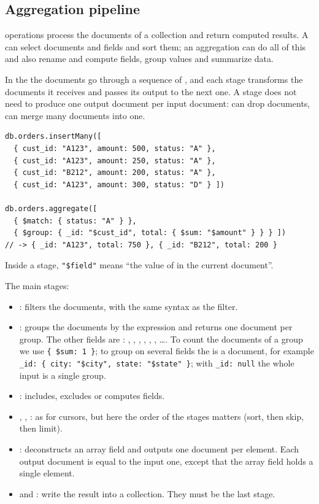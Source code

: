 \subsection{Aggregation pipeline}
 operations process the documents of a collection and return computed results. A  can select documents and fields and sort them; an aggregation can do all of this and also rename and compute fields, group values and summarize data.

In the  the documents go through a sequence of , and each stage transforms the documents it receives and passes its output to the next one. A stage does not need to produce one output document per input document:  can drop documents,  can merge many documents into one.

\begin{example}
\begin{lstlisting}
db.orders.insertMany([
  { cust_id: "A123", amount: 500, status: "A" },
  { cust_id: "A123", amount: 250, status: "A" },
  { cust_id: "B212", amount: 200, status: "A" },
  { cust_id: "A123", amount: 300, status: "D" } ])

db.orders.aggregate([
  { $match: { status: "A" } },
  { $group: { _id: "$cust_id", total: { $sum: "$amount" } } } ])
// -> { _id: "A123", total: 750 }, { _id: "B212", total: 200 }
\end{lstlisting}
Inside a stage, \texttt{"\$field"} means ``the value of  in the current document''.
\end{example}

The main stages:
\begin{itemize}
  \item {}: filters the documents, with the same syntax as the  filter.
  \item {}: groups the documents by the  expression and returns one document per group. The other fields are : , , , , , , \dots. To count the documents of a group we use \texttt{\{ \$sum: 1 \}}; to group on several fields the  is a document, for example \texttt{\_id: \{ city: "\$city", state: "\$state" \}}; with \texttt{\_id: null} the whole input is a single group.
  \item {}: includes, excludes or computes fields.
  \item {}, , : as for cursors, but here the order of the stages matters (sort, then skip, then limit).
  \item {}: deconstructs an array field and outputs one document per element. Each output document is equal to the input one, except that the array field holds a single element.
  \item {} and : write the result into a collection. They must be the last stage.
\end{itemize}

